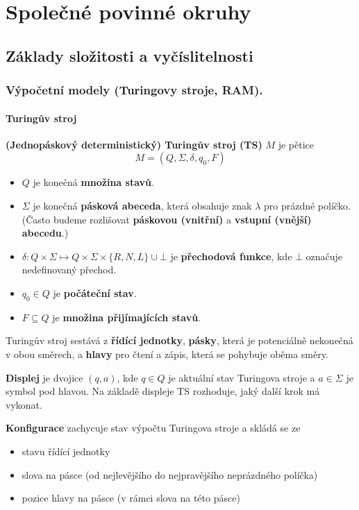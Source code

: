 \documentclass[11pt]{report} %
\begin{document}
	
\tableofcontents
\part{Společné povinné okruhy}
\chapter{Základy složitosti a vyčíslitelnosti}
\section{Výpočetní modely (Turingovy stroje, RAM).}
\subsection{Turingův stroj}
\textbf{(Jednopáskový deterministický) Turingův stroj (TS)} $M$ je pětice
$$M = (Q, \Sigma, \delta, q_0, F)$$
\begin{itemize}
	\leftskip 40pt
	\setlength{\itemsep}{0pt}
	\item $Q$ je konečná \textbf{množina stavů}.
	\item $\Sigma$ je konečná \textbf{pásková abeceda}, která obsahuje znak $\lambda$ pro prázdné políčko. (Často budeme rozlišovat \textbf{páskovou (vnitřní)} a \textbf{vstupní (vnější) abecedu}.)
	\item $\delta : Q \times \Sigma \mapsto Q \times \Sigma \times \{R, N, L\} \cup {\bot}$ je \textbf{přechodová funkce},
	kde $\bot$ označuje nedefinovaný přechod.
	\item $q_0 \in Q$ je \textbf{počáteční stav}.
	\item $F \subseteq Q$ je \textbf{množina přijímajících stavů}.
\end{itemize}

Turingův stroj sestává z \textbf{řídící jednotky}, \textbf{pásky}, která je potenciálně nekonečná v obou směrech, a
\textbf{hlavy} pro čtení a zápis, která se pohybuje oběma směry.

\textbf{Displej} je dvojice $(q, a)$, kde $q \in Q$ je aktuální stav Turingova stroje a $a \in \Sigma$ je symbol pod hlavou. Na základě displeje TS rozhoduje, jaký další krok má vykonat.

\textbf{Konfigurace} zachycuje stav výpočtu Turingova stroje a skládá se ze
\begin{itemize}
	\leftskip 40pt
	\setlength{\itemsep}{0pt}
	\item stavu řídící jednotky
	\item slova na pásce (od nejlevějšího do nejpravějšího neprázdného políčka)
	\item pozice hlavy na pásce (v rámci slova na této pásce)
\end{itemize}
\end{document}

